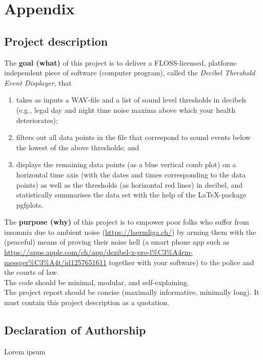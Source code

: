 \section{Appendix}

\subsection{Project description}

The \textbf{goal (what)} of this project is to deliver a FLOSS-licensed, platform-independent piece of
software (computer program), called the \textit{Decibel Threshold Event Displayer}, that

\begin{enumerate}
    \item takes as inputs a WAV-file and a list of sound level thresholds in decibels (e.g., legal day
    and night time noise maxima above which your health deteriorates);
    \item filters out all data points in the file that correspond to sound events below the lowest of
    the above thresholds; and
    \item displays the remaining data points (as a blue vertical comb plot) on a horizontal time
    axis (with the dates and times corresponding to the data points) as well as the
    thresholds (as horizontal red lines) in decibel, and statistically summarises the data set
    with the help of the LaTeX-package pgfplots.
\end{enumerate}

The \textbf{purpose (why)} of this project is to empower poor folks who suffer from insomnia due to
ambient noise (\url{https://laermliga.ch/}) by arming them with the (peaceful) means of proving
their noise hell (a smart phone app such as \url{https://apps.apple.com/ch/app/dezibel-x-pro-l%C3%A4rm-messger%C3%A4t/id1257651611} together with your software) to the police and the courts of law.\\

The code should be minimal, modular, and self-explaining.\\

The project report should be concise (maximally informative, minimally long). It must contain
this project description as a quotation.

\subsection{Declaration of Authorship}
Lorem ipsum